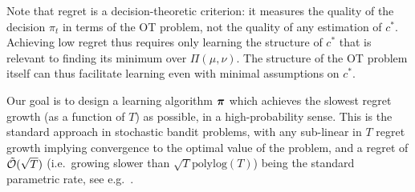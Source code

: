 Note that regret is a decision-theoretic criterion: it measures the quality of the decision $\pi_t$ in terms of the OT problem, not the quality of any estimation of $c^*$. Achieving low regret thus requires only learning the structure of $c^*$ that is relevant to finding its minimum over $\Pi(\mu,\nu)$. The structure of the OT problem itself can thus facilitate learning even with minimal assumptions on $c^*$.

Our goal is to design a learning algorithm $\bm{\pi}$ which achieves the slowest regret growth (as a function of $T$) as possible, in a high-probability sense. This is the standard approach in stochastic bandit problems, with any sub-linear in $T$ regret growth implying convergence to the optimal value of the problem, and a regret of $\tilde{\mathcal{O}}(\sqrt{T})$ (i.e.\ growing slower than $\sqrt{T}\mathrm{polylog}(T)$) being the standard parametric rate, see e.g.\ \citep[Thm.~9.1, Thm.~19.2, Thm.~38.6]{lattimore_bandit_2020}. 



        



        
